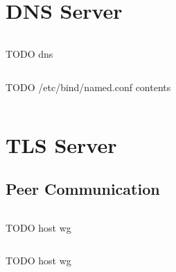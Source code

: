 \section{DNS Server}

\blindtext

\begin{listing}[ht]
\inputminted{bash}{snippets/dns.bash}
\caption[Signing a new X.509 certificate for ns.example.com using OpenSSL]{TODO dns}
\end{listing}

\blindtext

\begin{listing}[ht]
\inputminted{bash}{snippets/bind}
\caption[DNS over HTTPS configuration using BIND 9]{TODO /etc/bind/named.conf contents}
\end{listing}

\blindtext

\begin{listing}[ht]
\inputminted{zone}{snippets/example.zone}
\caption[Zone file for example.com zone with distributed ECH]{}
\end{listing}

\blindtext











\section{TLS Server}

\blindtext

\subsection{Peer Communication}

\blindtext

\begin{listing}[ht]
\inputminted{bash}{snippets/host_wg.bash}
\caption[Generating a new WireGuard key pair for tcd.example.com]{TODO host wg}
\end{listing}

\blindtext

\begin{listing}[ht]
\inputminted{ini}{snippets/host_wg.ini}
\caption[Configuring a WireGuard network interface using systemd]{TODO host wg}
\end{listing}


